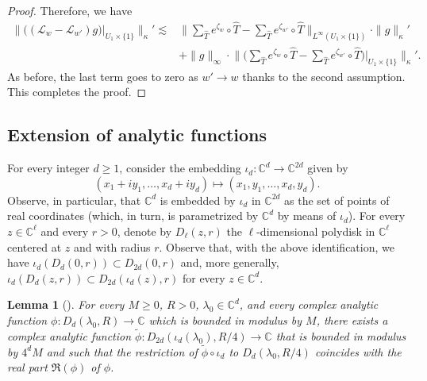 \documentclass[11pt]{amsart}
\theoremstyle{plain}
\newtheorem{lem}[thm]{Lemma}
\theoremstyle{definition}
\theoremstyle{remark}
\newcommand{\bbC}{\mathbb{C}} %
\begin{document}
\begin{proof}
Therefore, we have
$$
\begin{aligned}
\big\|
\big(
(\mathcal{L}_w-\mathcal{L}_{w'})g
\big)
|_{
U_1 \times \{1\}}
\big\|_\kappa'
 \lesssim & \Big\|
 \sum_{\hat T} e^{\zeta_{w}} \circ \hat T - \sum_{\hat T} e^{\zeta_{w'}} \circ \hat T \Big\|_{L^\infty (
  U_1 \times \{1\}
 )}
\cdot \|g\|_\kappa'\\
&+ \|g\|_\infty \cdot 
\Big\|
\big(
\sum_{\hat{T}} e^{\zeta_{w}} \circ \hat{T} - \sum_{\hat{T}} e^{\zeta_{w'}}\circ \hat{T}
\big) |_{
 U_1 \times \{1\}
}\Big\|_\kappa'.
\end{aligned}$$
As before, the last term goes to zero as $w'\to w$ thanks to the second assumption.
This completes the proof.
\end{proof}


\subsection{Extension of analytic functions}\label{ss:extension-analytic}
For every integer $d \ge 1$, consider the embedding $\iota_d \colon \mathbb{C}^d \to \mathbb{C}^{2d}$ given by 
\begin{equation}\label{eq_iota}
(x_1+iy_1,\ldots,x_d+iy_d) \mapsto (x_1,y_1,\ldots,x_d,y_d).
\end{equation}
Observe, in particular,
that $\mathbb C^d$ is embedded by $\iota_d$ in $\mathbb C^{2d}$ as the set of points of real coordinates
(which, in turn, is 
parametrized by $\mathbb C^d$ by means of $\iota_d$). 
For every $z \in \mathbb{C}^\ell$
and every $r>0$, denote by $D_\ell(z,r)$ 
the 
$\ell$-dimensional 
polydisk in $\mathbb{C}^\ell$
centered at $z$ and with radius $r$.
Observe that, with the above identification, we 
have $\iota_d (D_d (0,r))\subset D_{2d} (0,r)$ and, more generally,
$\iota_d (D_d (z,r))\subset D_{2d} (\iota_d(z),r)$
for every $z \in \mathbb C^d$. 

\begin{lem}[{\cite[Lemma 6.4]{SU10}}] \label{lem_6.3}
For every $M \ge 0$, 
$R>0$, 
 $\lambda_0 \in \bbC^d$, and 
 every complex analytic function
$\phi: D_d(\lambda_0,R) \to \bbC$
which is bounded in modulus by $M$, there exists a complex analytic function $\tilde{\phi} : D_{2d}(\iota_d (\lambda_0),R/4) \to \bbC$ that is bounded in modulus by $4^dM$ and such that the restriction of $\tilde \phi \circ \iota_d$ 
to
$D_d(\lambda_0,R/4)$ 
coincides with the real part $\Re(\phi)$ of $\phi$.
\end{lem}
\end{document}
